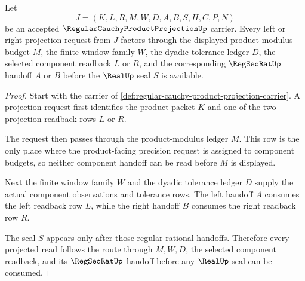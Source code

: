 \begin{theorem}\label{thm:regular-cauchy-product-projection-budget}
Let
$$
J=(K,L,R,M,W,D,A,B,S,H,C,P,N)
$$
be an accepted $\RegularCauchyProductProjectionUp$ carrier. Every left or right projection request from $J$ factors through the displayed product-modulus budget $M$, the finite window family $W$, the dyadic tolerance ledger $D$, the selected component readback $L$ or $R$, and the corresponding $\RegSeqRatUp$ handoff $A$ or $B$ before the $\RealUp$ seal $S$ is available.
\end{theorem}
\begin{proof}
Start with the carrier of \autoref{def:regular-cauchy-product-projection-carrier}. A projection request first identifies the product packet $K$ and one of the two projection readback rows $L$ or $R$.

The request then passes through the product-modulus ledger $M$. This row is the only place where the product-facing precision request is assigned to component budgets, so neither component handoff can be read before $M$ is displayed.

Next the finite window family $W$ and the dyadic tolerance ledger $D$ supply the actual component observations and tolerance rows. The left handoff $A$ consumes the left readback row $L$, while the right handoff $B$ consumes the right readback row $R$.

The seal $S$ appears only after those regular rational handoffs. Therefore every projected read follows the route through $M,W,D$, the selected component readback, and its $\RegSeqRatUp$ handoff before any $\RealUp$ seal can be consumed.
\end{proof}

